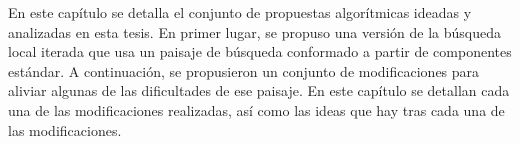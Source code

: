 En este capítulo se detalla el conjunto de propuestas algorítmicas ideadas y analizadas en esta tesis.
%
En primer lugar, se propuso una versión de la búsqueda local iterada que usa un paisaje de búsqueda conformado a partir de
componentes estándar.
%
A continuación, se propusieron un conjunto de modificaciones para aliviar algunas de las dificultades de ese paisaje.
%
En este capítulo se detallan cada una de las modificaciones realizadas, así como las ideas que hay tras cada una de las modificaciones.
